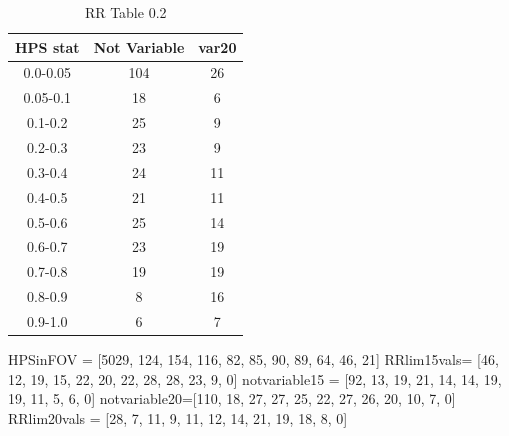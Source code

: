 \documentclass[aps,prb,twocolumn,superscriptaddress]{revtex4-1}
\begin{document}
	\begin{table}[H]
		\begin{center}
			\begin{tabular}{|c|c|c|}\hline
			HPS stat & Not Variable & var20 \\ \hline
			0.0-0.05 & 104 & 26 \\ \hline
			0.05-0.1 & 18 & 6 \\ \hline
			0.1-0.2 & 25 & 9 \\ \hline
			0.2-0.3 & 23 & 9 \\ \hline
			0.3-0.4 & 24 & 11 \\ \hline
			0.4-0.5 & 21 & 11 \\ \hline
			0.5-0.6 & 25 & 14 \\ \hline
			0.6-0.7 & 23 & 19 \\ \hline
			0.7-0.8 & 19 & 19 \\ \hline
			0.8-0.9 & 8 & 16 \\ \hline
			0.9-1.0 & 6 & 7 \\ \hline
			\end{tabular}
		\end{center}
	\caption{ \small{RR Table 0.2 \label{tab:HPSlim20}}}
	\end{table}

	HPSinFOV = [5029, 124, 154, 116, 82, 85, 90, 89, 64, 46, 21]
	RRlim15vals= [46, 12, 19, 15, 22, 20, 22, 28, 28, 23, 9, 0]
	notvariable15 = [92, 13, 19, 21, 14, 14, 19, 19, 11, 5, 6, 0]
	notvariable20=[110, 18, 27, 27, 25, 22, 27, 26, 20, 10, 7, 0]
	RRlim20vals =  [28, 7, 11, 9, 11, 12, 14, 21, 19, 18, 8, 0]

\fi
\end{document}
